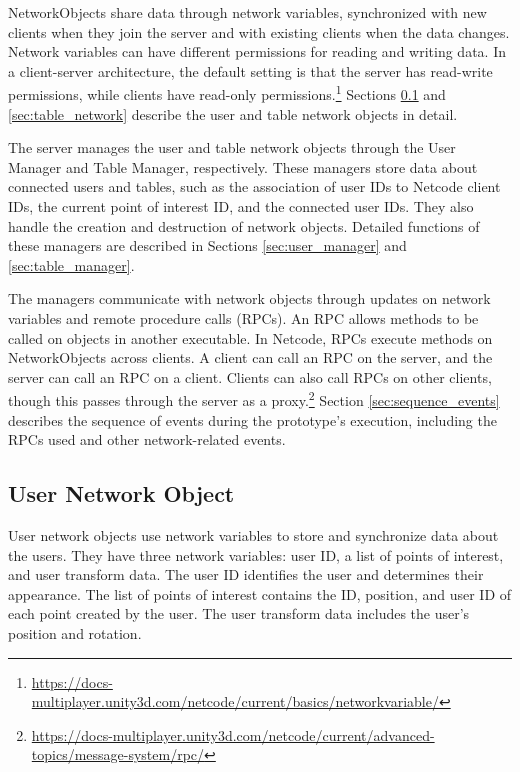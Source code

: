     NetworkObjects share data through network variables, synchronized with new clients when they join the server and with existing clients when the data changes. Network variables can have different permissions for reading and writing data. In a client-server architecture, the default setting is that the server has read-write permissions, while clients have read-only permissions.\footnote{\url{https://docs-multiplayer.unity3d.com/netcode/current/basics/networkvariable/}} Sections \ref{sec:user_network} and \ref{sec:table_network} describe the user and table network objects in detail. 

    The server manages the user and table network objects through the User Manager and Table Manager, respectively. These managers store data about connected users and tables, such as the association of user IDs to Netcode client IDs, the current point of interest ID, and the connected user IDs. They also handle the creation and destruction of network objects. Detailed functions of these managers are described in Sections \ref{sec:user_manager} and \ref{sec:table_manager}.

    The managers communicate with network objects through updates on network variables and remote procedure calls (RPCs). An RPC allows methods to be called on objects in another executable. In Netcode, RPCs execute methods on NetworkObjects across clients. A client can call an RPC on the server, and the server can call an RPC on a client. Clients can also call RPCs on other clients, though this passes through the server as a proxy.\footnote{\url{https://docs-multiplayer.unity3d.com/netcode/current/advanced-topics/message-system/rpc/}} Section \ref{sec:sequence_events} describes the sequence of events during the prototype's execution, including the RPCs used and other network-related events.

    \subsection{User Network Object} \label{sec:user_network}

        User network objects use network variables to store and synchronize data about the users. They have three network variables: user ID, a list of points of interest, and user transform data. The user ID identifies the user and determines their appearance. The list of points of interest contains the ID, position, and user ID of each point created by the user. The user transform data includes the user's position and rotation.

